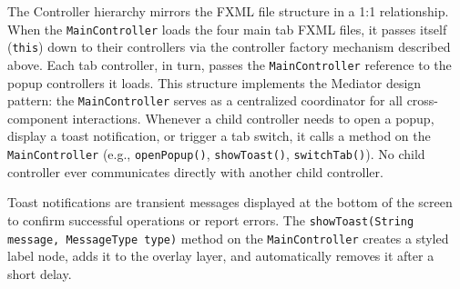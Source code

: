 The Controller hierarchy mirrors the FXML file structure in a 1:1 relationship. When the \texttt{MainController} loads the four main tab FXML files, it passes itself (\texttt{this}) down to their controllers via the controller factory mechanism described above. Each tab controller, in turn, passes the \texttt{MainController} reference to the popup controllers it loads. This structure implements the Mediator design pattern: the \texttt{MainController} serves as a centralized coordinator for all cross-component interactions. Whenever a child controller needs to open a popup, display a toast notification, or trigger a tab switch, it calls a method on the \texttt{MainController} (e.g., \texttt{openPopup()}, \texttt{showToast()}, \texttt{switchTab()}). No child controller ever communicates directly with another child controller.

Toast notifications are transient messages displayed at the bottom of the screen to confirm successful operations or report errors. The \texttt{showToast(String message, MessageType type)} method on the \texttt{MainController} creates a styled label node, adds it to the overlay layer, and automatically removes it after a short delay.

